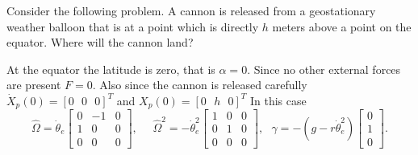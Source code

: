 \documentclass[graybox,envcountchap,sectrefs]{svmonoMuga}
\begin{document}
\begin{example}\label{ex:Projectile}
Consider the following problem. A cannon is released from a geostationary weather balloon that is  at a point which is directly $h$ meters above a point on the equator. Where will the cannon land?

At the equator the latitude is zero, that is $\alpha=0$. Since no other external forces are present $F=0$. Also since the cannon is released carefully $\dot{X}_p(0)=[0\:\:\:0\:\:\:0]^T$ and ${X}_p(0)=[0\:\:\:h\:\:\:0]^T$
In this case
\[
\widehat{\Omega}= \dot{\theta}_e\left[
\begin{array}{ccc}
0 & -1 & 0 \\
1 & 0 & 0\\
0 & 0 & 0
\end{array}
\right],\:\:\:\:\:\:
\widehat{\Omega}^2= -\dot{\theta}^2_e\left[
\begin{array}{ccc}
1 & 0 & 0\\
0 & 1 & 0 \\
0 & 0  & 0
\end{array}
\right],\:\:\:
\gamma=-(g-r\dot{\theta}_e^2)\begin{bmatrix}0 \\ 1\\ 0\end{bmatrix}.
\]


\end{example}
\end{document}
